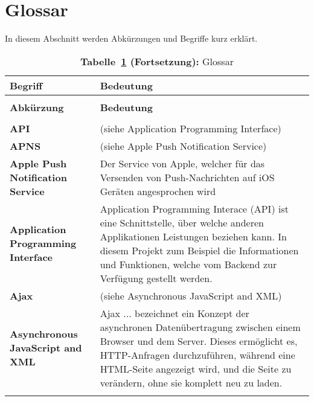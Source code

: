 %
%

\section{Glossar}\label{glossar}

In diesem Abschnitt werden Abkürzungen und Begriffe kurz erklärt.

\begin{longtable}{>{\raggedright}m{3cm}m{11cm}}

\caption[Glossar]{\label{app_tbl:Abbr}Glossar}\\ 
\toprule
\textbf{Begriff}&\textbf{Bedeutung}\\ \midrule\addlinespace
\endfirsthead
\caption*{\textbf{Tabelle~\ref{app_tbl:Abbr} (Fortsetzung):} Glossar}\\ \toprule
\textbf{Abkürzung}&\textbf{Bedeutung}\\ \midrule\addlinespace
\endhead

\bottomrule\multicolumn{2}{>{\small\raggedleft\arraybackslash}r}{\slshape Fortsetzung auf der nächsten Seite}\\
\endfoot
\bottomrule
\endlastfoot		

	\textbf{API}&
	(siehe Application Programming Interface)\\ \addlinespace

	\textbf{APNS}&
	(siehe Apple Push Notification Service)\\ \addlinespace	

	\textbf{Apple Push Notification Service}&
	Der Service von Apple, welcher für das Versenden von Push-Nachrichten auf iOS Geräten angesprochen wird\\ \addlinespace	

	\textbf{Application Programming Interface}&
	Application Programming Interace (API) ist eine Schnittstelle, über welche anderen Applikationen Leistungen beziehen kann. In diesem Projekt zum Beispiel die Informationen und Funktionen, welche vom Backend zur Verfügung gestellt werden.\\ \addlinespace

	\textbf{Ajax}&
	(siehe Asynchronous JavaScript and XML)\\ \addlinespace	

	\textbf{Asynchronous JavaScript and XML}&
	Ajax ... bezeichnet ein Konzept der asynchronen Datenübertragung zwischen einem Browser und dem Server. Dieses ermöglicht es, HTTP-Anfragen durchzuführen, während eine HTML-Seite angezeigt wird, und die Seite zu verändern, ohne sie komplett neu zu laden.\cite{wiki_ajax}\\ \addlinespace	


\end{longtable}
